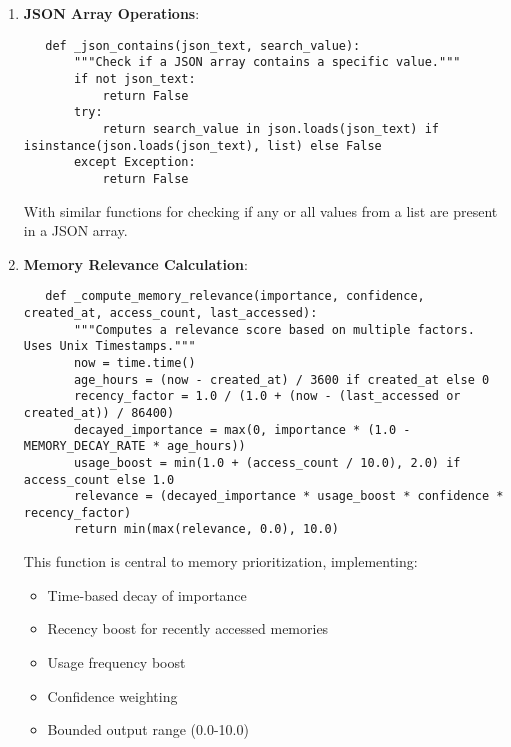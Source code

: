 \documentclass[12pt,a4paper]{article}
\begin{document}
\begin{enumerate}[label=\arabic*.]
    \item \textbf{JSON Array Operations}:
    \begin{pageablecode}
    \begin{verbatim}
   def _json_contains(json_text, search_value):
       """Check if a JSON array contains a specific value."""
       if not json_text:
           return False
       try:
           return search_value in json.loads(json_text) if isinstance(json.loads(json_text), list) else False
       except Exception:
           return False
    \end{verbatim}
    \end{pageablecode}
    With similar functions for checking if any or all values from a list are present in a JSON array.

    \item \textbf{Memory Relevance Calculation}:
    \begin{pageablecode}
    \begin{verbatim}
   def _compute_memory_relevance(importance, confidence, created_at, access_count, last_accessed):
       """Computes a relevance score based on multiple factors. Uses Unix Timestamps."""
       now = time.time()
       age_hours = (now - created_at) / 3600 if created_at else 0
       recency_factor = 1.0 / (1.0 + (now - (last_accessed or created_at)) / 86400)
       decayed_importance = max(0, importance * (1.0 - MEMORY_DECAY_RATE * age_hours))
       usage_boost = min(1.0 + (access_count / 10.0), 2.0) if access_count else 1.0
       relevance = (decayed_importance * usage_boost * confidence * recency_factor)
       return min(max(relevance, 0.0), 10.0)
    \end{verbatim}
    \end{pageablecode}
    This function is central to memory prioritization, implementing:
    \begin{itemize}
        \item Time-based decay of importance
        \item Recency boost for recently accessed memories
        \item Usage frequency boost
        \item Confidence weighting
        \item Bounded output range (0.0-10.0)
    \end{itemize}
\end{enumerate}
\end{document}
